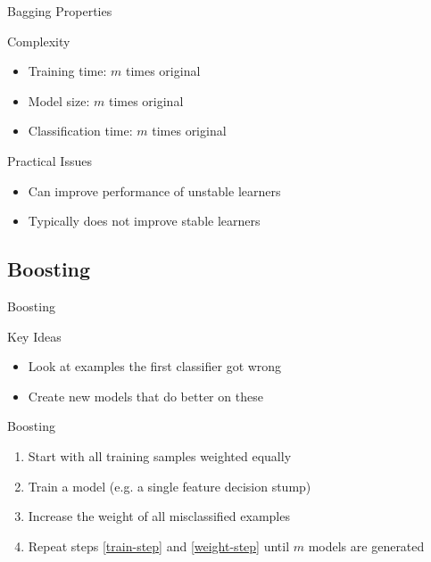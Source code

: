 \documentclass[14pt]{beamer}
\begin{document}
\begin{frame}{Bagging Properties}
\begin{block}{Complexity}
\begin{itemize}
\pause
\item Training time: \pause $m$ times original
\pause
\item Model size: \pause $m$ times original
\pause
\item Classification time: \pause $m$ times original
\end{itemize}
\end{block}
\pause
\begin{block}{Practical Issues}
\begin{itemize}
\item Can improve performance of unstable learners
\item Typically does not improve stable learners
\end{itemize}
\end{block}
\end{frame}

\subsection{Boosting}

\begin{frame}[<+->]{Boosting}
\begin{block}{Key Ideas}
\begin{itemize}
\item Look at examples the first classifier got wrong
\item Create new models that do better on these
\end{itemize}
\end{block}
\begin{block}{Boosting}
\begin{enumerate}
\item Start with all training samples weighted equally
\item\label{train-step} Train a model (e.g. a single feature \alert{decision stump})
\item\label{weight-step} Increase the weight of all misclassified examples
\item Repeat steps \ref{train-step} and \ref{weight-step} until $m$ models are generated
\end{enumerate}
\end{block}
\end{frame}
\end{document}
